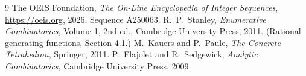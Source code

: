 \documentclass[11pt,a4paper]{article}
\theoremstyle{plain}
\theoremstyle{definition}
\begin{document}
\begin{thebibliography}{9}
 The OEIS Foundation, \emph{The On-Line Encyclopedia of Integer
Sequences}, \url{https://oeis.org}, 2026. Sequence A250063.
 R.~P.~Stanley, \emph{Enumerative Combinatorics}, Volume 1, 2nd ed.,
Cambridge University Press, 2011. (Rational generating functions, Section 4.1.)
 M.~Kauers and P.~Paule, \emph{The Concrete Tetrahedron}, Springer, 2011.
 P.~Flajolet and R.~Sedgewick, \emph{Analytic Combinatorics}, Cambridge
University Press, 2009.
\end{thebibliography}
\end{document}
